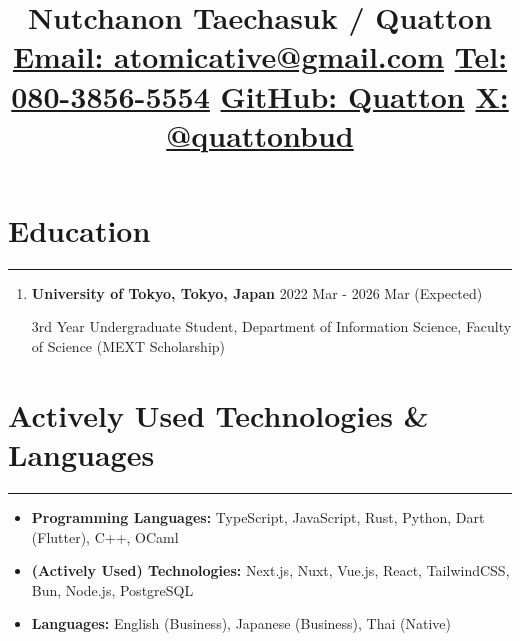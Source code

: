 \documentclass[
  a4paper,
  10pt,
  dvipdfmx
]{article}
\begin{document}
\newcommand{\cvsection}[1]{
  \section*{#1}
  \hrule
  \bigskip
}

\title{
  \vspace{-2cm}Nutchanon Taechasuk / Quatton \\
  \vspace{0.25cm}
  \small{
    \href{mailto:atomicative@gmail.com}{Email: atomicative@gmail.com}
    \hfill
    \href{tel:+8180-3856-5554}{Tel: 080-3856-5554}
    \hfill
    \href{http://github.com/Quatton}{GitHub: Quatton}
    \hfill
    \href{http://x.com/quattonbud}{X: @quattonbud}
  }
  \vspace{-1.5cm}
}
\date{}
\maketitle
{}

\cvsection{Education}
\begin{enumerate}[]
  \item \textbf{University of Tokyo, Tokyo, Japan} \hfill 2022 Mar - 2026 Mar (Expected)

        3rd Year Undergraduate Student, Department of Information Science, Faculty of Science (MEXT Scholarship)
\end{enumerate}


\cvsection{Actively Used Technologies \& Languages}

\begin{itemize}
  \itemsep0em
  \item \textbf{Programming Languages:} TypeScript, JavaScript, Rust, Python, Dart (Flutter), C++, OCaml
  \item \textbf{(Actively Used) Technologies:} Next.js, Nuxt, Vue.js, React, TailwindCSS, Bun, Node.js, PostgreSQL
  \item \textbf{Languages:} English (Business), Japanese (Business), Thai (Native)
\end{itemize}
\end{document}
